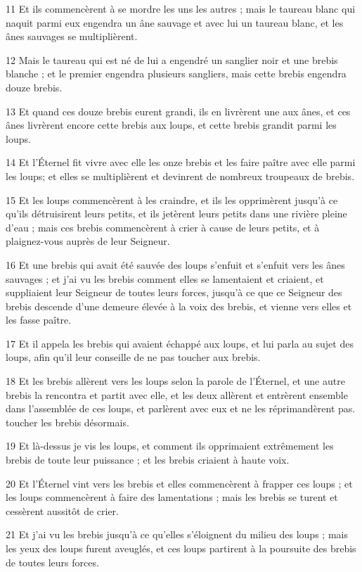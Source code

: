 \par 11 Et ils commencèrent à se mordre les uns les autres ; mais le taureau blanc qui naquit parmi eux engendra un âne sauvage et avec lui un taureau blanc, et les ânes sauvages se multiplièrent.
\par 12 Mais le taureau qui est né de lui a engendré un sanglier noir et une brebis blanche ; et le premier engendra plusieurs sangliers, mais cette brebis engendra douze brebis.
\par 13 Et quand ces douze brebis eurent grandi, ils en livrèrent une aux ânes, et ces ânes livrèrent encore cette brebis aux loups, et cette brebis grandit parmi les loups.
\par 14 Et l'Éternel fit vivre avec elle les onze brebis et les faire paître avec elle parmi les loups; et elles se multiplièrent et devinrent de nombreux troupeaux de brebis.
\par 15 Et les loups commencèrent à les craindre, et ils les opprimèrent jusqu'à ce qu'ils détruisirent leurs petits, et ils jetèrent leurs petits dans une rivière pleine d'eau ; mais ces brebis commencèrent à crier à cause de leurs petits, et à plaignez-vous auprès de leur Seigneur.
\par 16 Et une brebis qui avait été sauvée des loups s'enfuit et s'enfuit vers les ânes sauvages ; et j'ai vu les brebis comment elles se lamentaient et criaient, et suppliaient leur Seigneur de toutes leurs forces, jusqu'à ce que ce Seigneur des brebis descende d'une demeure élevée à la voix des brebis, et vienne vers elles et les fasse paître.
\par 17 Et il appela les brebis qui avaient échappé aux loups, et lui parla au sujet des loups, afin qu'il leur conseille de ne pas toucher aux brebis.
\par 18 Et les brebis allèrent vers les loups selon la parole de l'Éternel, et une autre brebis la rencontra et partit avec elle, et les deux allèrent et entrèrent ensemble dans l'assemblée de ces loups, et parlèrent avec eux et ne les réprimandèrent pas. toucher les brebis désormais.
\par 19 Et là-dessus je vis les loups, et comment ils opprimaient extrêmement les brebis de toute leur puissance ; et les brebis criaient à haute voix.
\par 20 Et l'Éternel vint vers les brebis et elles commencèrent à frapper ces loups ; et les loups commencèrent à faire des lamentations ; mais les brebis se turent et cessèrent aussitôt de crier.
\par 21 Et j'ai vu les brebis jusqu'à ce qu'elles s'éloignent du milieu des loups ; mais les yeux des loups furent aveuglés, et ces loups partirent à la poursuite des brebis de toutes leurs forces.
